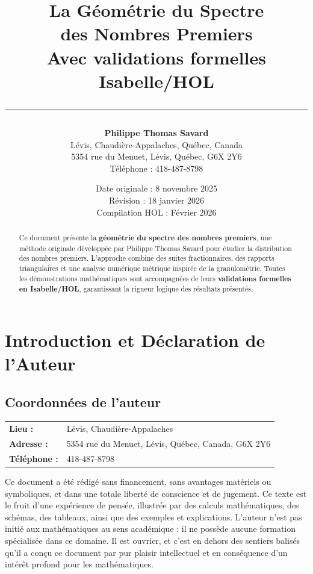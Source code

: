 \documentclass[a4paper,11pt]{article}
\title{
    \vspace{-2cm}
    {\LARGE \textbf{La Géométrie du Spectre}}\\[0.5cm]
    {\LARGE \textbf{des Nombres Premiers}}\\[1cm]
    {\large Avec validations formelles Isabelle/HOL}\\[0.5cm]
    \rule{\textwidth}{0.4pt}
}
\author{
    \textbf{Philippe Thomas Savard}\\[0.3cm]
    \small Lévis, Chaudière-Appalaches, Québec, Canada\\
    \small 5354 rue du Menuet, Lévis, Québec, G6X 2Y6\\
    \small Téléphone : 418-487-8798
}
\date{
    \vspace{0.5cm}
    Date originale : 8 novembre 2025\\
    Révision : 18 janvier 2026\\
    Compilation HOL : Février 2026
}
\begin{document}
\maketitle
\thispagestyle{empty}

\vspace{1cm}

\begin{abstract}
Ce document présente la \textbf{géométrie du spectre des nombres premiers}, une méthode originale développée par Philippe Thomas Savard pour étudier la distribution des nombres premiers. L'approche combine des suites fractionnaires, des rapports triangulaires et une analyse numérique métrique inspirée de la granulométrie. Toutes les démonstrations mathématiques sont accompagnées de leurs \textbf{validations formelles en Isabelle/HOL}, garantissant la rigueur logique des résultats présentés.
\end{abstract}

\newpage
\tableofcontents
\newpage

\section{Introduction et Déclaration de l'Auteur}

\subsection{Coordonnées de l'auteur}

\begin{center}
\begin{tabular}{ll}
\textbf{Lieu :} & Lévis, Chaudière-Appalaches \\
\textbf{Adresse :} & 5354 rue du Menuet, Lévis, Québec, Canada, G6X 2Y6 \\
\textbf{Téléphone :} & 418-487-8798 \\
\end{tabular}
\end{center}

\vspace{0.5cm}

Ce document a été rédigé sans financement, sans avantages matériels ou symboliques, et dans une totale liberté de conscience et de jugement. Ce texte est le fruit d'une expérience de pensée, illustrée par des calculs mathématiques, des schémas, des tableaux, ainsi que des exemples et explications. L'auteur n'est pas initié aux mathématiques au sens académique : il ne possède aucune formation spécialisée dans ce domaine. Il est ouvrier, et c'est en dehors des sentiers balisés qu'il a conçu ce document par pur plaisir intellectuel et en conséquence d'un intérêt profond pour les mathématiques.
\end{document}

